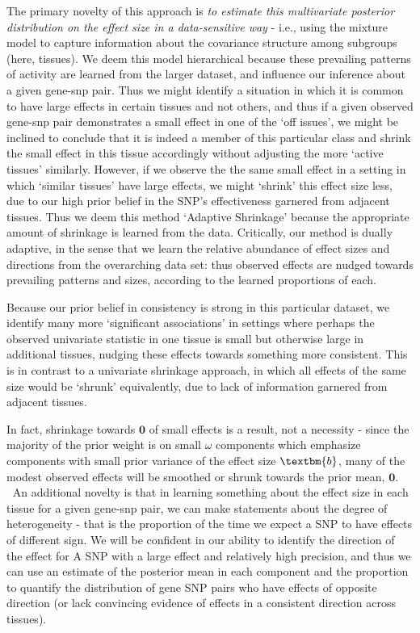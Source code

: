 The primary novelty of this approach is {\it to estimate this multivariate posterior distribution on the effect size in a data-sensitive way} - i.e., using the mixture model to capture information about the covariance structure among subgroups (here, tissues). We deem this model hierarchical because these prevailing patterns of activity are learned from the larger dataset, and influence our inference about a given gene-snp pair. Thus we might identify a situation in which it is common to have large effects in certain tissues and not others, and thus if a given observed gene-snp pair demonstrates a small effect in one of the `off issues', we might be inclined to conclude that it is indeed a member of this particular class and shrink the small effect in this tissue accordingly without adjusting the more `active tissues' similarly. However, if we observe the the same small effect in a setting in which `similar tissues' have large effects, we might `shrink' this effect size less, due to our high prior belief in the SNP's effectiveness garnered from adjacent tissues. Thus we deem this method `Adaptive Shrinkage' because the appropriate amount of shrinkage is learned from the data. Critically, our method is dually adaptive, in the sense that we learn the relative abundance of effect sizes and directions from the overarching data set: thus observed effects are nudged towards prevailing patterns and sizes, according to the learned proportions of each.

Because our prior belief in consistency is strong in this particular dataset, we identify many more `significant associations'  in settings where perhaps the observed univariate statistic in one tissue is small but otherwise large in additional tissues, nudging these effects towards something more consistent. This is in contrast to a univariate shrinkage approach, in which all effects of the same size would be `shrunk' equivalently, due to lack of information garnered from adjacent tissues. 

In fact, shrinkage towards $\bm{0}$ of small effects is a result, not a necessity - since the majority of the prior weight is on small $\omega$ components which emphasize components with small prior variance of the effect size $\textbm{b}$, many of the modest observed effects will be smoothed or shrunk towards the prior mean, $\bm{0}$. 
An additional novelty is that in learning something about the effect size in each tissue for a given gene-snp pair, we can make statements about the degree of heterogeneity - that is the proportion of the time we expect a SNP to have effects of different sign. We will be confident in our ability to identify the direction of the effect for A SNP with a large effect and relatively high precision, and thus we can use an estimate of the posterior mean in each component and the proportion to quantify the distribution of gene SNP pairs who have effects of opposite direction (or lack convincing evidence of effects in a consistent direction across tissues).
